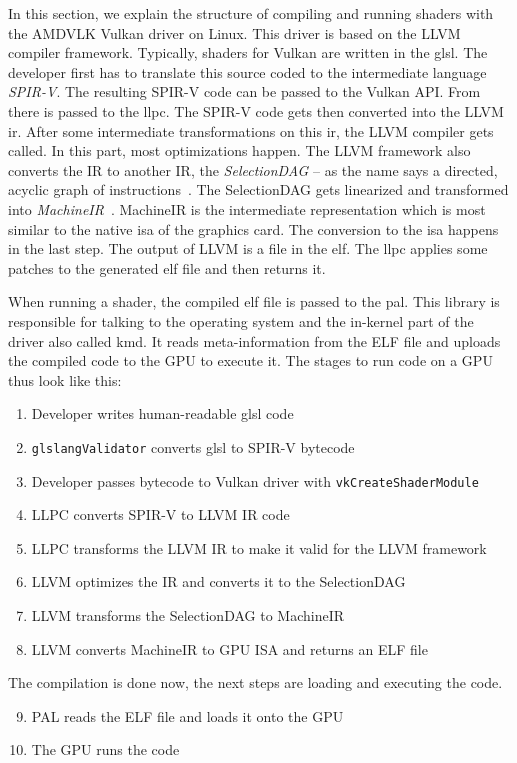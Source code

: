 In this section, we explain the structure of compiling and running shaders with the AMDVLK Vulkan driver on Linux. This driver is based on the LLVM compiler framework. Typically, shaders for Vulkan are written in the \gls{glsl}. The developer first has to translate this source coded to the intermediate language \emph{SPIR-V}. The resulting SPIR-V code can be passed to the Vulkan API. From there is passed to the \gls{llpc}. The SPIR-V code gets then converted into the LLVM \gls{ir}. After some intermediate transformations on this \gls{ir}, the LLVM compiler gets called. In this part, most optimizations happen.
The LLVM framework also converts the IR to another IR, the \emph{SelectionDAG} -- as the name says a directed, acyclic graph of instructions~\cite{llvmSelectionDag}. The SelectionDAG gets linearized and transformed into \emph{MachineIR}~\cite{llvmSelectionDag}. MachineIR is the intermediate representation which is most similar to the native \gls{isa} of the graphics card. The conversion to the \gls{isa} happens in the last step. The output of LLVM is a file in the \gls{elf}. The \gls{llpc} applies some patches to the generated \gls{elf} file and then returns it.

When running a shader, the compiled \gls{elf} file is passed to the \gls{pal}. This library is responsible for talking to the operating system and the in-kernel part of the driver also called \gls{kmd}. It reads meta-information from the ELF file and uploads the compiled code to the GPU to execute it. The stages to run code on a GPU thus look like this:

\begin{enumerate}
	\item Developer writes human-readable \gls{glsl} code
	\item \texttt{glslangValidator} converts \gls{glsl} to SPIR-V bytecode
	\item Developer passes bytecode to Vulkan driver with \texttt{vkCreateShaderModule}
	\item LLPC converts SPIR-V to LLVM IR code
	\item LLPC transforms the LLVM IR to make it valid for the LLVM framework
	\item LLVM optimizes the IR and converts it to the SelectionDAG
	\item LLVM transforms the SelectionDAG to MachineIR
	\item LLVM converts MachineIR to GPU ISA and returns an ELF file
\end{enumerate}
The compilation is done now, the next steps are loading and executing the code.
\begin{enumerate}
	\setcounter{enumi}{8}
	\item PAL reads the ELF file and loads it onto the GPU
	\item The GPU runs the code
\end{enumerate}

